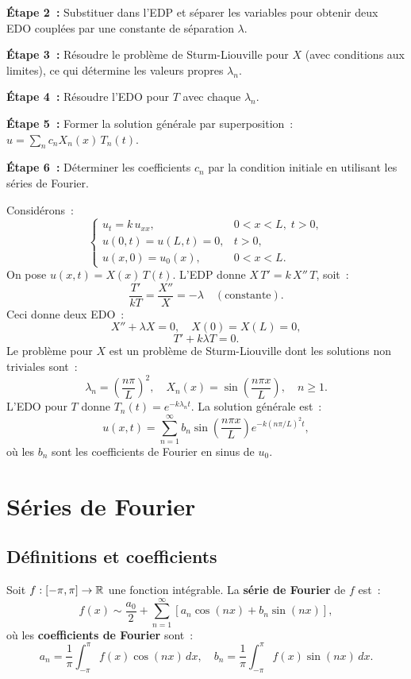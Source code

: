 \textbf{\'Etape 2~:} Substituer dans l'EDP et s\'eparer les variables
pour obtenir deux EDO coupl\'ees par une constante de s\'eparation $\lambda$.

\textbf{\'Etape 3~:} R\'esoudre le probl\`eme de Sturm-Liouville pour $X$
(avec conditions aux limites), ce qui d\'etermine les valeurs propres $\lambda_n$.

\textbf{\'Etape 4~:} R\'esoudre l'EDO pour $T$ avec chaque $\lambda_n$.

\textbf{\'Etape 5~:} Former la solution g\'en\'erale par superposition~:
$u = \sum_n c_n X_n(x)\, T_n(t)$.

\textbf{\'Etape 6~:} D\'eterminer les coefficients $c_n$ par la condition initiale
en utilisant les s\'eries de Fourier.

\begin{exemple}
Consid\'erons~:
\[
    \begin{cases}
        u_t = k\, u_{xx}, & 0 < x < L,\; t > 0,\\
        u(0,t) = u(L,t) = 0, & t > 0,\\
        u(x,0) = u_0(x), & 0 < x < L.
    \end{cases}
\]
On pose $u(x,t) = X(x)\, T(t)$. L'EDP donne $X\, T' = k\, X''\, T$, soit~:
\[
    \frac{T'}{kT} = \frac{X''}{X} = -\lambda \quad (\text{constante}).
\]
Ceci donne deux EDO~:
\[
    X'' + \lambda X = 0, \quad X(0) = X(L) = 0,
\]
\[
    T' + k\lambda T = 0.
\]
Le probl\`eme pour $X$ est un probl\`eme de Sturm-Liouville dont les
solutions non triviales sont~:
\[
    \lambda_n = \left(\frac{n\pi}{L}\right)^2, \quad
    X_n(x) = \sin\!\left(\frac{n\pi x}{L}\right), \quad n \geq 1.
\]
L'EDO pour $T$ donne $T_n(t) = e^{-k\lambda_n t}$. La solution g\'en\'erale est~:
\[
    u(x,t) = \sum_{n=1}^{\infty} b_n \sin\!\left(\frac{n\pi x}{L}\right)
    e^{-k(n\pi/L)^2 t},
\]
o\`u les $b_n$ sont les coefficients de Fourier en sinus de $u_0$.
\end{exemple}

\section{S\'eries de Fourier}

\subsection{D\'efinitions et coefficients}

\begin{definition}
Soit $f : [-\pi, \pi] \to \mathbb{R}$ une fonction int\'egrable. La \textbf{s\'erie
de Fourier} de $f$ est~:
\begin{equation}\label{eq:serie_fourier}
    f(x) \sim \frac{a_0}{2} + \sum_{n=1}^{\infty}
    \left[a_n \cos(nx) + b_n \sin(nx)\right],
\end{equation}
o\`u les \textbf{coefficients de Fourier} sont~:
\begin{equation}\label{eq:coefficients_fourier}
    a_n = \frac{1}{\pi}\int_{-\pi}^{\pi} f(x)\cos(nx)\, dx, \quad
    b_n = \frac{1}{\pi}\int_{-\pi}^{\pi} f(x)\sin(nx)\, dx.
\end{equation}
\end{definition}

